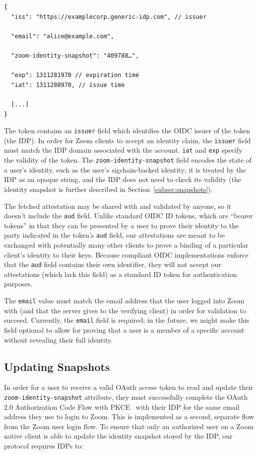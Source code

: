 \begin{Verbatim}
{
  "iss": "https://examplecorp.generic-idp.com", // issuer

  "email": "alice@example.com",

  "zoom-identity-snapshot": "409788…",

  "exp": 1311281970 // expiration time
  "iat": 1311280970, // issue time

  [...]
}
\end{Verbatim}

The token contains an \texttt{issuer} field which identifies the OIDC issuer of the token (the IDP).
In order for Zoom clients to accept an identity claim, the \texttt{issuer} field must match the IDP
domain associated with the account. \texttt{iat} and \texttt{exp} specify the validity of the token.
The \texttt{zoom-identity-snapshot} field encodes the state of a user’s identity, such as the user's
sigchain-backed identity; it is treated by the IDP as an opaque string, and the IDP does not need to
check its validity (the identity snapshot is further described in Section~\ref{subsec:snapshots}).  

The fetched attestation may be shared with and validated by anyone, so it doesn't include the
\texttt{aud} field. Unlike standard OIDC ID tokens, which are ``bearer tokens'' in that they can be
presented by a user to prove their identity to the party indicated in the token's \texttt{aud}
field, our attestations are meant to be exchanged with potentially many other clients to prove a
binding of a particular client's identity to their keys. Because compliant OIDC implementations
enforce that the \texttt{aud} field contains their own identifier, they will not accept our
attestations (which lack this field) as a standard ID token for authentication purposes.

The \texttt{email} value must match the email address that the user logged into Zoom with (and that
the server gives to the verifying client) in order for validation to succeed.  Currently, the
\texttt{email} field is required; in the future, we might make this field optional to allow for
proving that a user is a member of a specific account without revealing their full identity.

\subsection{Updating Snapshots}\label{subsec:generateattestation}
In order for a user to receive a valid OAuth access token to read and update their
\texttt{zoom-identity-snapshot} attribute, they must successfully complete the OAuth 2.0
Authorization Code Flow with PKCE~\cite{rfc7636} with their IDP for the same email address they use
to login to Zoom. This is implemented as a second, separate flow from the Zoom user login flow. To
ensure that only an authorized user on a Zoom native client is able to update the identity snapshot
stored by the IDP, our protocol requires IDPs to:

